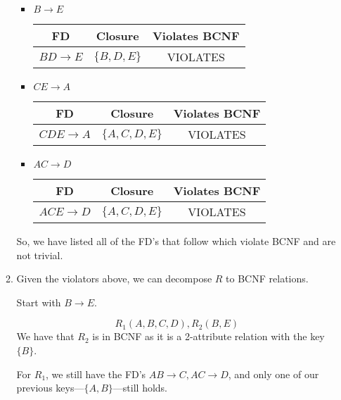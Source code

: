 \documentclass[12pt,letterpaper]{article}
\begin{document}
\begin{enumerate}
\begin{enumerate}
          \begin{itemize}
            \item $B \rightarrow E$

              \begin{tabular}{c | c | c |}
                FD                    & Closure             & Violates BCNF \\
                \hline
                $BD \rightarrow E$    & $\{B, D, E\}$       & VIOLATES \\
                \hline
              \end{tabular}

            \item $CE \rightarrow A$

              \begin{tabular}{c | c | c |}
                FD                    & Closure             & Violates BCNF \\
                \hline
                $CDE \rightarrow A$   & $\{A, C, D, E\}$    & VIOLATES \\
                \hline
              \end{tabular}

            \item $AC \rightarrow D$

              \begin{tabular}{c | c | c |}
                FD                    & Closure             & Violates BCNF \\
                \hline
                $ACE \rightarrow D$   & $\{A, C, D, E\}$    & VIOLATES \\
                \hline
              \end{tabular}
          \end{itemize}

          So, we have listed all of the FD's that follow which violate BCNF and are not trivial.

        \item
          Given the violators above, we can decompose $R$ to BCNF relations.

          Start with $B \rightarrow E$.

          \[R_1(A, B, C, D), R_2(B, E)\]
          We have that $R_2$ is in BCNF as it is a 2-attribute relation with the key $\{B\}$.

          For $R_1$, we still have the FD's $AB \rightarrow C, AC \rightarrow D$,
          and only one of our previous keys---$\{A, B\}$---still holds.


\end{enumerate}
\end{enumerate}
\end{document}
